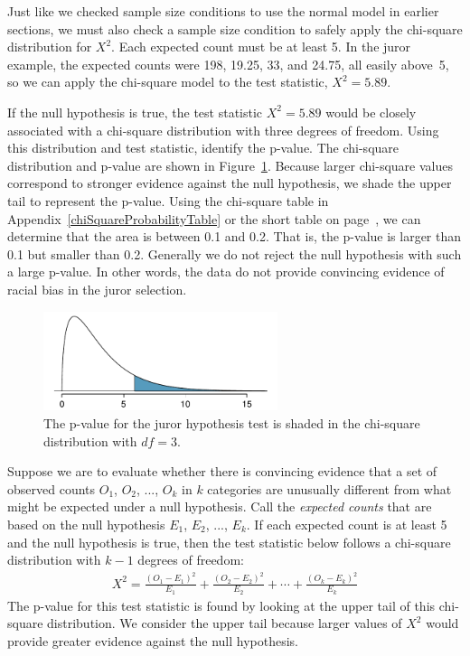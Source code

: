 Just like we checked sample size conditions to use the normal model in earlier sections, we must also check a sample size condition to safely apply the chi-square distribution for $X^2$. Each expected count must be at least 5. In the juror example, the expected counts were 198, 19.25, 33, and 24.75, all easily above~5, so we can apply the chi-square model to the test statistic, $X^2=5.89$.

\begin{example}{If the null hypothesis is true, the test statistic $X^2=5.89$ would be closely associated with a chi-square distribution with three degrees of freedom. Using this distribution and test statistic, identify the p-value.}
The chi-square distribution and p-value are shown in Figure~\ref{jurorHTPValueShown}. Because larger chi-square values correspond to stronger evidence against the null hypothesis, we shade the upper tail to represent the p-value. Using the chi-square table in Appendix~\ref{chiSquareProbabilityTable} or the short table on page~\pageref{chiSquareProbabilityTableShort}, we can determine that the area is between 0.1 and 0.2. That is, the p-value is larger than 0.1 but smaller than 0.2. Generally we do not reject the null hypothesis with such a large p-value. In other words, the data do not provide convincing evidence of racial bias in the juror selection.
\end{example}

\begin{figure}[h]
\centering
\includegraphics[width=0.61\textwidth]{06/figures/jurorHTPValueShown/jurorHTPValueShown}
\caption{The p-value for the juror hypothesis test is shaded in the chi-square distribution with $df=3$.}
\label{jurorHTPValueShown}
\end{figure}

\begin{termBox}{
Suppose we are to evaluate whether there is convincing evidence that a set of observed counts $O_1$, $O_2$, ..., $O_k$ in $k$ categories are unusually different from what might be expected under a null hypothesis. Call the \emph{expected counts} that are based on the null hypothesis $E_1$, $E_2$, ..., $E_k$. If each expected count is at least 5 and the null hypothesis is true, then the test statistic below follows a chi-square distribution with $k-1$ degrees of freedom:
\begin{align*}
X^2 = \frac{(O_1 - E_1)^2}{E_1} + \frac{(O_2 - E_2)^2}{E_2} + \cdots + \frac{(O_k - E_k)^2}{E_k}
\end{align*}
The p-value for this test statistic is found by looking at the upper tail of this chi-square distribution. We consider the upper tail because larger values of $X^2$ would provide greater evidence against the null hypothesis.}
\end{termBox}

